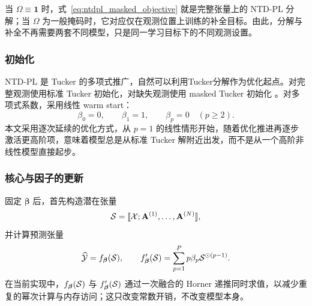 当 $\Omega\equiv \mathbf 1$ 时，式~\eqref{eq:ntdpl_masked_objective} 就是完整张量上的 NTD-PL 分解；当 $\Omega$ 为一般掩码时，它对应仅在观测位置上训练的补全目标。由此，分解与补全不再需要两套不同模型，只是同一学习目标下的不同观测设置。

\subsubsection{初始化}

NTD-PL 是 Tucker 的多项式推广，自然可以利用Tucker分解作为优化起点。对完整观测使用标准 Tucker 初始化，对缺失观测使用 masked Tucker 初始化 \cite{yang2016iterative, liu2012tensor}。对多项式系数，采用线性 warm start：
\begin{equation}
\beta_0=0,\qquad \beta_1=1,\qquad \beta_p=0\quad (p\ge 2).
\label{eq:beta_warm_start}
\end{equation}
本文采用逐次延续的优化方式，从 $p=1$ 的线性情形开始，随着优化推进再逐步激活更高阶项，意味着模型总是从标准 Tucker 解附近出发，而不是从一个高阶非线性模型直接起步。

\subsubsection{核心与因子的更新}

固定 $\boldsymbol\beta$ 后，首先构造潜在张量
\begin{equation}
\mathcal{S} = \llbracket \mathcal{X};\mathbf A^{(1)},\dots,\mathbf A^{(N)}\rrbracket,
\end{equation}
并计算预测张量
\begin{equation}
\widehat{\mathcal{Y}}=f_{\boldsymbol\beta}(\mathcal{S}),
\qquad
f_{\boldsymbol\beta}'(\mathcal{S})=\sum_{p=1}^{P} p\beta_p\mathcal{S}^{\odot(p-1)}.
\label{eq:poly_derivative_tensor}
\end{equation}
在当前实现中，$f_{\boldsymbol\beta}(\mathcal{S})$ 与 $f_{\boldsymbol\beta}'(\mathcal{S})$ 通过一次融合的 Horner 递推同时求值，以减少重复的幂次计算与内存访问；这只改变常数开销，不改变模型本身。

